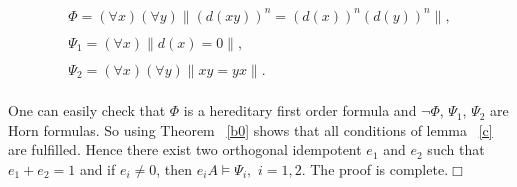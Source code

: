 \documentclass[12pt]{amsart}
\theoremstyle{definition}
\theoremstyle{remark}
\begin{document}
 $$\begin{array}{l}
 \Phi =  (\forall x )(\forall y )  \| (d(xy))^n=(d(x))^n(d(y))^n \|,\\ \\
 \Psi_{1} = (\forall x )  \| d(x)=0\|,\\ \\
 \Psi_{2} = (\forall x)(\forall y)\|xy=yx \|.
 \end{array}$$\\
 One can easily check that $\Phi $ is a hereditary first order
 formula and $\neg \Phi$, $\Psi_{1}$, $\Psi_{2}$ are Horn formulas.
 So using Theorem ~\ref{b0} shows that all conditions of lemma
 ~\ref{c} are fulfilled. Hence there exist two orthogonal
 idempotent $e_{1}$ and $e_{2}$ such that $e_{1} + e_{2} = 1$
 and if $e_{i} \neq 0$, then $e_{i}A \models \Psi_{i},$
 $i = 1, 2.$ The proof is complete.\hfill $\Box$
\end{document}
